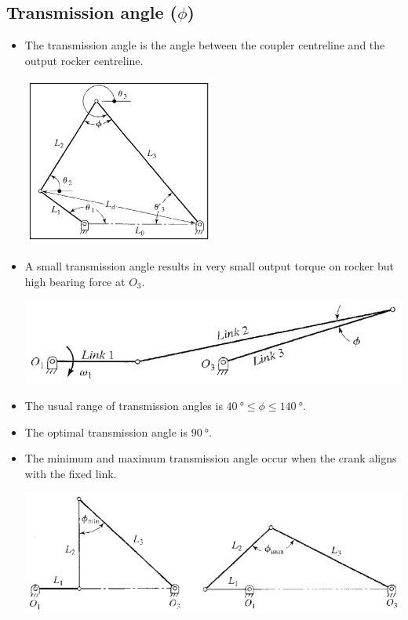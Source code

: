 \documentclass[11pt]{article}
\begin{document}
 \newpage
\subsection{Transmission angle (\(\phi\))}
\label{sec:orgf1e0886}
\begin{itemize}
\item The transmission angle is the angle between the coupler centreline and the output rocker centreline.

\begin{center}
\includegraphics[height=15em]{./images/transmission-angle-image.png}
\end{center}
\item A small transmission angle results in very small output torque on rocker but high bearing force at \(O_3\).
\begin{center}
\includegraphics[width=.9\linewidth]{./images/small-transmission-angle-image.png}
\end{center}
\item The usual range of transmission angles is \(\qty{40}{\degree} \le \phi \le \qty{140}{\degree}\).
\item The optimal transmission angle is \(\qty{90}{\degree}\).
\item The minimum and maximum transmission angle occur when the crank aligns with the fixed link.
\begin{center}
\includegraphics[width=.9\linewidth]{./images/minimum-and-maximum-transmission-angle.png}
\end{center}
\end{itemize}
\end{document}
